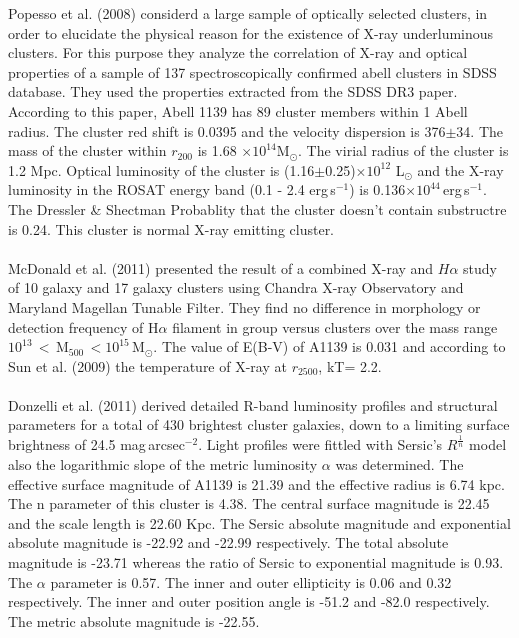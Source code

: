 Popesso et al. (2008) considerd a large sample of optically selected clusters, in order to elucidate the physical reason for the existence of X-ray underluminous clusters. For this purpose they analyze the correlation of X-ray and optical properties of a sample of 137 spectroscopically confirmed abell clusters in SDSS database. They used the properties extracted from the SDSS DR3 paper. According to this paper, Abell 1139 has 89 cluster members within 1 Abell radius. The cluster red shift is 0.0395 and the velocity dispersion is 376$\pm$34. The mass of the cluster within $r_{200}$ is 1.68 $\times 10^{14}$M$_{\odot}$. The virial radius of the cluster is 1.2 Mpc. Optical luminosity of the cluster is (1.16$\pm$0.25)$\times 10^{12}$ L$_{\odot}$ and the X-ray luminosity in the ROSAT energy band (0.1 - 2.4 erg\,s$^{-1}$) is 0.136$\times 10^{44}$\,erg\,s$^{-1}$. The Dressler \& Shectman Probablity that the cluster doesn't contain substructre is 0.24. This cluster is normal X-ray emitting cluster.\\\\
McDonald et al. (2011) presented the result of a combined X-ray and $H\alpha$ study of 10 galaxy and 17 galaxy clusters using Chandra X-ray Observatory and Maryland Magellan Tunable Filter. They find no difference in morphology or detection frequency of H$\alpha$ filament in group versus clusters over the mass range $10^{13}\,<$\,M$_{500}\,<10^{15}$\,M$_{\odot}$. The value of E(B-V) of A1139 is 0.031 and according to  Sun et al. (2009) the temperature of X-ray at $r_{2500}$, kT= 2.2.\\\\
Donzelli et al. (2011) derived detailed R-band luminosity profiles and structural parameters for a total of 430 brightest cluster galaxies, down to a limiting surface brightness of 24.5 mag\,arcsec$^{-2}$. Light profiles were fittled with Sersic's $R^{\frac{1}{n}}$ model also the logarithmic slope of the metric luminosity $\alpha$ was determined. The effective surface magnitude of A1139 is 21.39 and the effective radius is 6.74 kpc. The n parameter of this cluster is 4.38. The central surface magnitude is 22.45 and the scale length is 22.60 Kpc. The Sersic absolute magnitude and exponential absolute magnitude is -22.92 and -22.99   respectively. The total absolute magnitude is -23.71 whereas the ratio of Sersic to exponential magnitude is 0.93. The $\alpha$ parameter is 0.57. The inner and outer ellipticity is 0.06 and 0.32 respectively. The inner and outer position angle is -51.2 and -82.0 respectively. The metric absolute magnitude is -22.55.   \\\\
